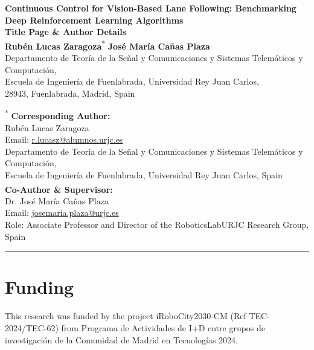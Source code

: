 \documentclass[11pt]{article}
\begin{document}
\begin{center}
    \vspace*{2em}
    \LARGE \textbf{Continuous Control for Vision-Based Lane Following: Benchmarking Deep Reinforcement Learning Algorithms} \\[1.5em]
    \large \textbf{Title Page \& Author Details} \\[2.5em]
    
    \large \textbf{Rubén Lucas Zaragoza}\textsuperscript{*} \quad \textbf{José María Cañas Plaza}\textsuperscript{\textdagger} \\[1.5em]
    
    \small
    Departamento de Teoría de la Señal y Comunicaciones y Sistemas Telemáticos y Computación, \\
    Escuela de Ingeniería de Fuenlabrada, Universidad Rey Juan Carlos, \\
    28943, Fuenlabrada, Madrid, Spain
\end{center}

\vspace{3em}

\noindent \textsuperscript{*} \textbf{Corresponding Author:} \\
Rubén Lucas Zaragoza \\
Email: \href{mailto:r.lucasz@alumnos.urjc.es}{r.lucasz@alumnos.urjc.es} \\
Departamento de Teoría de la Señal y Comunicaciones y Sistemas Telemáticos y Computación, \\
Escuela de Ingeniería de Fuenlabrada, Universidad Rey Juan Carlos, Spain \\[2em]

\noindent \textsuperscript{\textdagger} \textbf{Co-Author \& Supervisor:} \\
Dr. José María Cañas Plaza \\
Email: \href{mailto:josemaria.plaza@urjc.es}{josemaria.plaza@urjc.es} \\
Role: Associate Professor and Director of the RoboticsLabURJC Research Group, Spain

\vspace{4em}
\hrule
\vspace{2.5em}

\section*{Funding}
This research was funded by the project iRoboCity2030-CM (Ref TEC-2024/TEC-62) from Programa de Actividades de I+D entre grupos de investigación de la Comunidad de Madrid en Tecnologías 2024.
\end{document}

